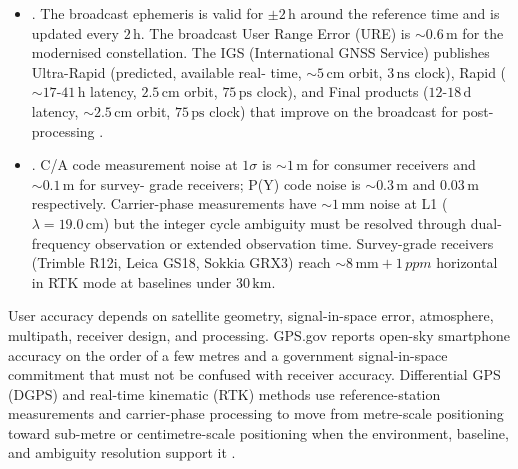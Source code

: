 \begin{itemize}[leftmargin=*]
    receiver antenna. The maximum multipath error for code (C/A)
    measurements is $\sim 0.5 \cdot \tau \cdot c$ where $\tau$ is
    the chip period ($1\,\si{\micro\second}/1023 \approx
    977\,\si{\nano\second}$ for C/A, hence $\sim 150\,\si{\meter}$
    maximum theoretical error), but practical receivers use
    narrow-correlator or strobe-correlator architectures (NovAtel
    PAC, Trimble Maxwell) that limit the error to $\sim 1$-$3\,\si{
    \meter}$ in typical environments and $5$-$50\,\si{\meter}$ in
    deep urban canyons. Carrier-phase multipath is bounded by
    $\lambda/4$ ($\sim 5\,\si{\centi\meter}$ for L1), much smaller
    but still significant for RTK applications.
  \item {}. The
    broadcast ephemeris is valid for $\pm 2\,\si{\hour}$ around the
    reference time and is updated every $2\,\si{\hour}$. The
    broadcast User Range Error (URE) is $\sim 0.6\,\si{\meter}$
    for the modernised constellation. The IGS (International GNSS
    Service) publishes Ultra-Rapid (predicted, available real-
    time, $\sim 5\,\si{\centi\meter}$ orbit, $3\,\si{\nano\second}$
    clock), Rapid ($\sim 17$-$41\,\si{\hour}$ latency,
    $2.5\,\si{\centi\meter}$ orbit, $75\,\si{\pico\second}$ clock),
    and Final products ($12$-$18\,\si{\day}$ latency,
    $\sim 2.5\,\si{\centi\meter}$ orbit, $75\,\si{\pico\second}$
    clock) that improve on the broadcast for post-processing
    \cite{web:gpsgov-accuracy}.
  \item {}. C/A code
    measurement noise at $1\sigma$ is $\sim 1\,\si{\meter}$ for
    consumer receivers and $\sim 0.1\,\si{\meter}$ for survey-
    grade receivers; P(Y) code noise is $\sim 0.3\,\si{\meter}$
    and $0.03\,\si{\meter}$ respectively. Carrier-phase
    measurements have $\sim 1\,\si{\milli\meter}$ noise at L1
    ($\lambda = 19.0\,\si{\centi\meter}$) but the integer cycle
    ambiguity must be resolved through dual-frequency observation
    or extended observation time. Survey-grade receivers
    (Trimble R12i, Leica GS18, Sokkia GRX3) reach $\sim 8\,\si{
    \milli\meter} + 1\,\si{ppm}$ horizontal in RTK mode at
    baselines under $30\,\si{\kilo\meter}$.
\end{itemize}

User accuracy depends on satellite geometry, signal-in-space
error, atmosphere, multipath, receiver design, and processing.
GPS.gov reports open-sky smartphone accuracy on the order of a few
metres and a government signal-in-space commitment that must not
be confused with receiver accuracy. Differential GPS (DGPS) and
real-time kinematic (RTK) methods use reference-station
measurements and carrier-phase processing to move from metre-scale
positioning toward sub-metre or centimetre-scale positioning when
the environment, baseline, and ambiguity resolution support it
\cite{web:gpsgov-accuracy,std:gps-sps-2020}.

